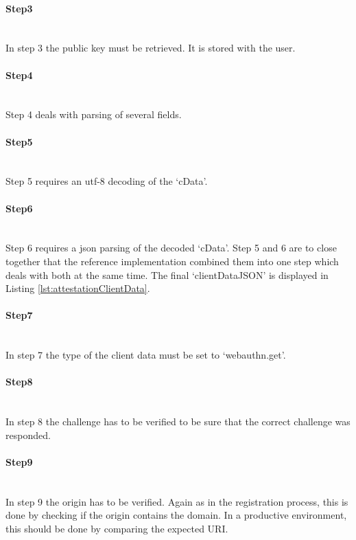 \documentclass[a4paper, 11pt]{scrartcl}
\begin{document}
\paragraph{Step3}\hfill \\ 
In step 3 the public key must be retrieved. It is stored with the user.

\paragraph{Step4}\hfill \\ 
Step 4 deals with parsing of several fields. 

\paragraph{Step5}\hfill \\ 
Step 5 requires an \gls{utf-8} decoding of the `cData'.

\paragraph{Step6}\hfill \\ 
Step 6 requires a \gls{json} parsing of the decoded `cData'. Step 5 and 6 are to close together that the reference implementation combined them into one step which deals with both at the same time. The final `clientDataJSON' is displayed in Listing \ref{lst:attestationClientData}.



\paragraph{Step7}\hfill \\ 
In step 7 the type of the client data must be set to `webauthn.get'.

\paragraph{Step8}\hfill \\ 
In step 8 the challenge has to be verified to be sure that the correct challenge was responded.

\paragraph{Step9}\hfill \\ 
In step 9 the origin has to be verified. Again as in the registration process, this is done by checking if the origin contains the domain. In a productive environment, this should be done by comparing the expected URI.
\end{document}
